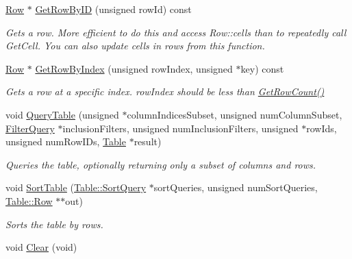 \begin{DoxyCompactItemize}
\item 
\hyperlink{struct_data_structures_1_1_table_1_1_row}{Row} $\ast$ \hyperlink{class_data_structures_1_1_table_afb41a20bcf3a3d3af431944d8fede211}{Get\-Row\-By\-I\-D} (unsigned row\-Id) const 
\begin{DoxyCompactList}\small\item\em Gets a row. More efficient to do this and access Row\-::cells than to repeatedly call Get\-Cell. You can also update cells in rows from this function. \end{DoxyCompactList}\item 
\hyperlink{struct_data_structures_1_1_table_1_1_row}{Row} $\ast$ \hyperlink{class_data_structures_1_1_table_aa1e5c3881ba2622651ae978b38d462b5}{Get\-Row\-By\-Index} (unsigned row\-Index, unsigned $\ast$key) const 
\begin{DoxyCompactList}\small\item\em Gets a row at a specific index. row\-Index should be less than \hyperlink{class_data_structures_1_1_table_a17ca98f3efdcab9be32839dc4b31a908}{Get\-Row\-Count()} \end{DoxyCompactList}\item 
void \hyperlink{class_data_structures_1_1_table_acb577f868d66e588ec14f6bc896bd214}{Query\-Table} (unsigned $\ast$column\-Indices\-Subset, unsigned num\-Column\-Subset, \hyperlink{struct_data_structures_1_1_table_1_1_filter_query}{Filter\-Query} $\ast$inclusion\-Filters, unsigned num\-Inclusion\-Filters, unsigned $\ast$row\-Ids, unsigned num\-Row\-I\-Ds, \hyperlink{class_data_structures_1_1_table}{Table} $\ast$result)
\begin{DoxyCompactList}\small\item\em Queries the table, optionally returning only a subset of columns and rows. \end{DoxyCompactList}\item 
void \hyperlink{class_data_structures_1_1_table_af29ddcd506b4752cd3904d4a808f9b24}{Sort\-Table} (\hyperlink{struct_data_structures_1_1_table_1_1_sort_query}{Table\-::\-Sort\-Query} $\ast$sort\-Queries, unsigned num\-Sort\-Queries, \hyperlink{struct_data_structures_1_1_table_1_1_row}{Table\-::\-Row} $\ast$$\ast$out)
\begin{DoxyCompactList}\small\item\em Sorts the table by rows. \end{DoxyCompactList}\item 
\hypertarget{class_data_structures_1_1_table_a636d2add07f010ec42117e69bbc92f9b}{void \hyperlink{class_data_structures_1_1_table_a636d2add07f010ec42117e69bbc92f9b}{Clear} (void)}\label{class_data_structures_1_1_table_a636d2add07f010ec42117e69bbc92f9b}


\end{DoxyCompactItemize}
